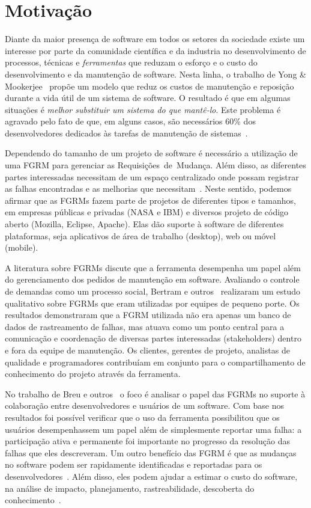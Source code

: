 \section{Motivação}
\label{sec:intro-motivacao}

Diante da maior presença de software em todos os setores da sociedade existe um
interesse por parte da comunidade científica e da industria no desenvolvimento
de processos, técnicas e \textit{ferramentas} que reduzam o esforço e o custo do
desenvolvimento e da manutenção de software. Nesta linha, o trabalho de Yong \&
Mookerjee~\cite{1423995} propõe um modelo que reduz os custos de manutenção e
reposição durante a vida útil de um sistema de software. O resultado é que em
algumas situações é \textit{melhor substituir um sistema do que mantê-lo}. Este
pro\-ble\-ma é agravado pelo fato de que, em alguns casos, são necessários 60\%
dos desenvolvedores dedicados às tarefas de manutenção de
sistemas~\cite{Zhang_2003}.

Dependendo do tamanho de um projeto de software é necessário a utilização de uma
FGRM para gerenciar as Requisições~de~Mudança. Além disso, as diferentes partes
interessadas necessitam de um espaço centralizado onde possam registrar as
falhas encontradas e as melhorias que necessitam~\cite{1407819}. Neste sentido,
podemos afirmar que as FGRMs fazem parte de projetos de diferentes tipos e
tamanhos, em empresas públicas e privadas (NASA e IBM) e diversos projeto de
código aberto (Mozilla, Eclipse, Apache). Elas dão suporte à software de
diferentes plataformas, seja aplicativos de área de trabalho (desktop), web ou
móvel (mobile).

A literatura sobre FGRMs discute que a ferramenta desempenha um papel além do
gerenciamento dos pedidos de manutenção em software. Avaliando o controle de
demandas como um processo social, Bertram e
outros~\cite{Bertram:2010:CCB:1718918.1718972} realizaram um estudo qualitativo
sobre FGRMs que eram utilizadas por equipes de pequeno porte. Os resultados
demonstraram que a FGRM utilizada não era apenas um banco de dados de
rastreamento de falhas, mas atuava como um ponto central para a comunicação e
coordenação de diversas partes interessadas (stakeholders) dentro e fora da
equipe de manutenção. Os clientes, gerentes de projeto, analistas de qualidade e
programadores contribuíam em conjunto para o compartilhamento de conhecimento do
projeto através da ferramenta.

No trabalho de Breu e outros~\cite{Breu:2010:INB:1718918.1718973} o foco é
analisar o papel das FGRMs no suporte à colaboração entre desenvolvedores e
usuários de um software. Com base nos resultados foi possível verificar que o
uso da ferramenta possibilitou que os usuários desempenhassem um papel além de
simplesmente reportar uma falha: a participação ativa e permanente foi
importante no progresso da resolução das falhas que eles descreveram. Um outro
benefício das FGRM é que as mudanças no software podem ser rapidamente
identificadas e reportadas para os desenvolvedores~\cite{anvik2005coping}. Além
disso, eles podem ajudar a estimar o custo do software, na análise de impacto,
planejamento, rastreabilidade, descoberta do
conhecimento~\cite{cavalcanti2013bug}.

